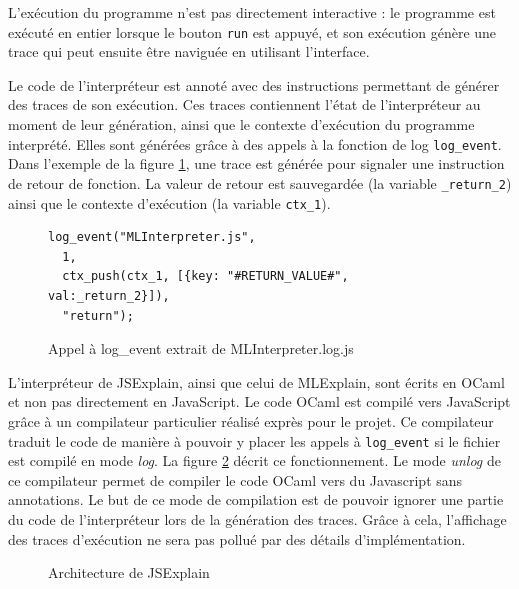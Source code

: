 \documentclass{easychair}
\begin{document}
L'exécution du programme n'est pas directement interactive : le programme est
exécuté en entier lorsque le bouton \texttt{run} est appuyé, et son exécution
génère une trace qui peut ensuite être naviguée en utilisant l'interface.

Le code de l'interpréteur est annoté 
avec des instructions permettant de générer des traces de son exécution. Ces 
traces contiennent l'état de l'interpréteur au moment de leur génération, ainsi 
que le contexte d'exécution du programme interprété. Elles sont générées grâce à 
des appels à la fonction de log \verb|log_event|. Dans l'exemple de la figure 
\ref{log_event}, une trace est générée pour signaler une instruction de retour 
de fonction. La valeur de retour est sauvegardée (la variable \verb|_return_2|) 
ainsi que le contexte d'exécution (la variable \verb|ctx_1|).

\begin{figure}[ht]
\begin{lstlisting}
log_event("MLInterpreter.js",
  1,
  ctx_push(ctx_1, [{key: "#RETURN_VALUE#", val:_return_2}]),
  "return");
\end{lstlisting}
\caption{Appel à log\_event extrait de MLInterpreter.log.js}
\label{log_event}
\end{figure}

L'interpréteur de JSExplain, ainsi que celui de MLExplain, sont écrits en OCaml 
et non pas directement en JavaScript. Le code OCaml est compilé vers JavaScript 
grâce à un compilateur particulier réalisé exprès pour le projet. Ce compilateur 
traduit le code de manière à pouvoir y placer les appels à \verb|log_event| si 
le fichier est compilé en mode \emph{log}. La figure \ref{arch_jsexplain} 
décrit ce fonctionnement. Le mode \emph{unlog} de ce compilateur permet de 
compiler le code OCaml vers du Javascript sans annotations. Le but de ce mode 
de compilation est de pouvoir ignorer une partie du code de l'interpréteur lors 
de la génération des traces. Grâce à cela, l'affichage des traces d'exécution 
ne sera pas pollué par des détails d'implémentation.

\begin{figure}[ht]
  
  \caption{Architecture de JSExplain}
  \label{arch_jsexplain}
\end{figure}
\end{document}
